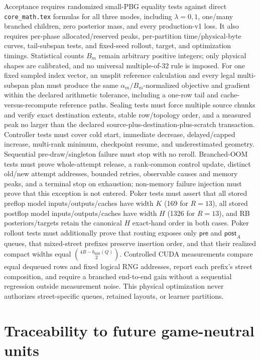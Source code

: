 \documentclass[10pt,a4paper]{article}
\begin{document}
Acceptance requires randomized small-PBG equality tests against direct
\texttt{core\_math.tex} formulas for all three modes, including $\lambda=0,1$,
one/many branched children, zero posterior mass, and every production-v1 loss.
It also requires per-phase allocated/reserved peaks, per-partition
time/physical-byte curves, tail-subspan tests, and fixed-seed rollout, target,
and optimization timings.  Statistical counts $B_m$ remain arbitrary positive
integers; only physical shapes are calibrated, and no universal multiple-of-32
rule is imposed.  For one fixed sampled index vector, an unsplit reference
calculation and every legal multi-subspan plan must produce the same
$\alpha_m/B_m$-normalized objective and gradient within the declared arithmetic
tolerance, including a one-row tail and cache-versus-recompute reference paths.
Sealing tests must force multiple source chunks and verify exact destination
extents, stable row/topology order, and a measured peak no larger than the
declared source-plus-destination-plus-scratch transaction.  Controller tests
must cover cold start, immediate decrease, delayed/capped increase, multi-rank
minimum, checkpoint resume, and underestimated geometry.  Sequential
pre-draw/singleton failure must stop with no reroll.  Branched-OOM tests must
prove whole-attempt release, a rank-common control update, distinct old/new
attempt addresses, bounded retries, observable causes and memory peaks, and a
terminal stop on exhaustion; non-memory failure injection must prove that this
exception is not entered.  Poker tests must assert that all stored
preflop model inputs/outputs/caches have width $K$ (169 for $R=13$), all stored
postflop model inputs/outputs/caches have width $H$ (1326 for $R=13$), and RB
posteriors/targets retain the canonical $H$ exact-hand order in both cases.
Poker rollout tests must additionally prove that routing exposes only
$\mathsf{pre}$ and $\mathsf{post}_A$ queues, that mixed-street prefixes preserve
insertion order, and that their realized compact widths equal
$\binom{4R-b_{\min}(Q)}2$.  Controlled CUDA measurements compare equal dequeued
rows and fixed logical RNG addresses, report each prefix's street composition,
and require a branched end-to-end gain without a sequential regression outside
measurement noise.  This physical optimization never authorizes
street-specific queues, retained layouts, or learner partitions.

\section{Traceability to future game-neutral units}
\end{document}
